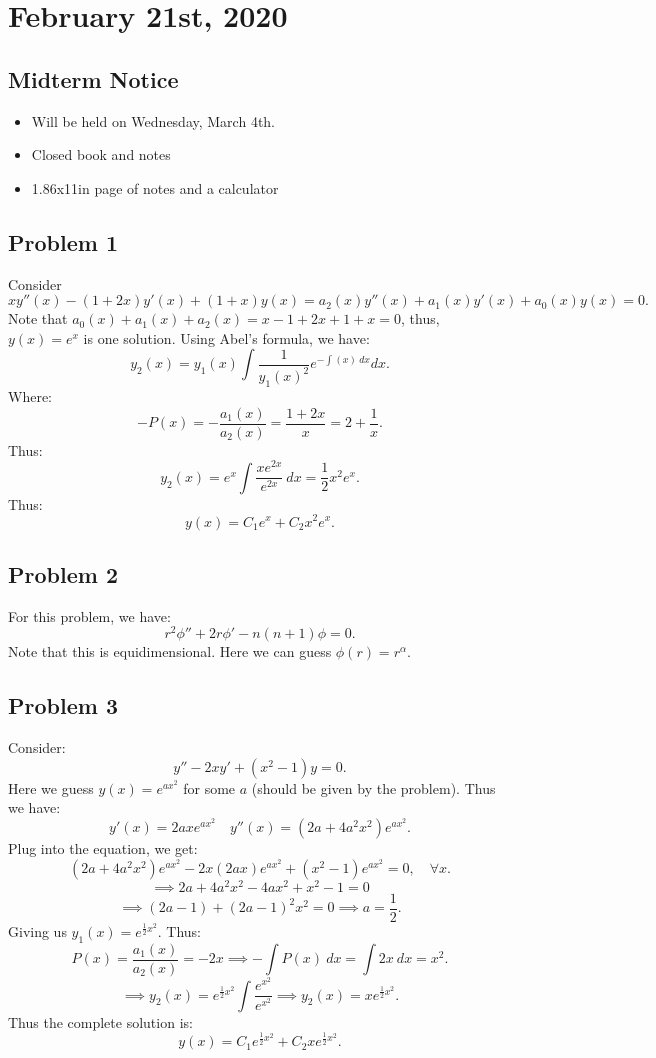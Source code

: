 \documentclass[../main/main.tex]{subfiles}
\begin{document}
\section{February 21st, 2020}
\subsection{Midterm Notice}
\begin{itemize}
	\item Will be held on Wednesday, March 4th.
	\item Closed book and notes
	\item 1.86x11in page of notes and a calculator
\end{itemize}
\subsection{Problem 1}
Consider  \[
	xy''(x)-(1+2x)y'(x) + (1+x)y(x) = a_2(x)y''(x)+a_1(x)y'(x)+a_0(x)y(x) =  0
.\] Note that $a_0(x)+a_1(x)+a_2(x) = x-1+2x+1+x=0$, thus, $y(x) = e^{x}$ is one solution. Using Abel's formula, we have: \[
y_2(x) = y_1(x) \int \frac{1}{y_1(x)^2} e^{-\int (x)~dx}dx
.\] Where: \[
-P(x) = -\frac{a_1(x)}{a_2(x)} = \frac{1+2x}{x}= 2+\frac{1}{x}
.\] Thus: \[
y_2(x) = e^{x}\int \frac{x e^{2x}}{e^{2x}}~dx = \frac{1}{2}x^2e^{x}
.\] Thus: \[
y(x) = C_1 e^{x}+C_2 x^2e^{x}
.\] 
\subsection{Problem 2}
For this problem, we have: \[
	r^2 \phi''+2r\phi'-n(n+1)\phi = 0
.\] Note that this is equidimensional. Here we can guess $\phi(r) = r^{\alpha}$. 
\subsection{Problem 3}
Consider: \[
	y''-2xy'+(x^2-1)y = 0
.\] Here we guess $y(x) = e^{ax^2}$ for some $a$ (should be given by the problem). Thus we have: \[
y'(x) = 2ax e^{ax^2} \quad y''(x) = (2a+4a^2x^2) e^{ax^2}
.\] Plug into the equation, we get: \[
(2a+4a^2x^2)e^{ax^2}-2x(2ax)e^{ax^2}+(x^2-1)e^{ax^2}=0, \quad \forall x
.\] \[
\implies 2a+4a^2x^2-4ax^2+x^2-1 = 0\]\[ \implies (2a-1) + (2a-1)^2x^2 = 0 \implies a = \frac{1}{2}
.\] Giving us $y_1(x) = e^{\frac{1}{2}x^2}$. Thus: \[
P(x) = \frac{a_1(x)}{a_2(x)}=-2x \implies -\int P(x)~dx = \int 2x~dx = x^2
.\] \[
\implies y_2(x) = e^{\frac{1}{2}x^2}\int \frac{e^{x^2}}{e^{x^2}} \implies y_2(x) = x e^{\frac{1}{2}x^2}
.\] Thus the complete solution is: \[
y(x) = C_1 e^{\frac{1}{2}x^2}+C_2 xe^{\frac{1}{2}x^2}
.\] 
\end{document}
